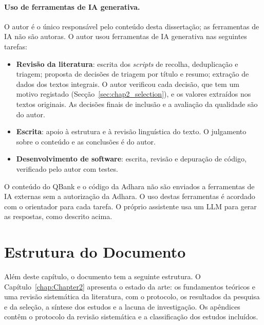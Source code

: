 \paragraph{Uso de ferramentas de IA generativa.} O autor é o único responsável pelo conteúdo desta dissertação; as ferramentas de \gls{IA} não são autoras. O autor usou ferramentas de \gls{IA} generativa nas seguintes tarefas:
\begin{itemize}
    \item \textbf{Revisão da literatura}: escrita dos \emph{scripts} de recolha, deduplicação e triagem; proposta de decisões de triagem por título e resumo; extração de dados dos textos integrais. O autor verificou cada decisão, que tem um motivo registado (Secção~\ref{sec:chap2_selection}), e os valores extraídos nos textos originais. As decisões finais de inclusão e a avaliação da qualidade são do autor.
    \item \textbf{Escrita}: apoio à estrutura e à revisão linguística do texto. O julgamento sobre o conteúdo e as conclusões é do autor.
    \item \textbf{Desenvolvimento de software}: escrita, revisão e depuração de código, verificado pelo autor com testes.
\end{itemize}
O conteúdo do QBank e o código da Adhara não são enviados a ferramentas de \gls{IA} externas sem a autorização da Adhara. O uso destas ferramentas é acordado com o orientador para cada tarefa. O próprio assistente usa um \gls{LLM} para gerar as respostas, como descrito acima.

\section{Estrutura do Documento}
\label{sec:chap1_structure}

Além deste capítulo, o documento tem a seguinte estrutura. O Capítulo~\ref{chap:Chapter2} apresenta o estado da arte: os fundamentos teóricos e uma revisão sistemática da literatura, com o protocolo, os resultados da pesquisa e da seleção, a síntese dos estudos e a lacuna de investigação. Os apêndices contêm o protocolo da revisão sistemática e a classificação dos estudos incluídos.
